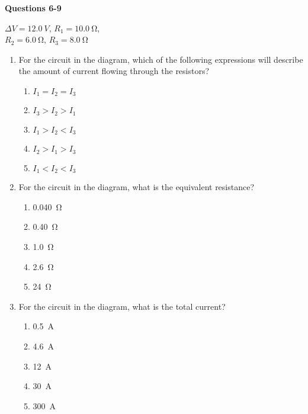 \documentclass{../../../oss-apphys}
\begin{document}
\begin{multicols}{2}
  \textbf{Questions 6-9}
  \begin{center}
    
    \vspace{.1in}$\Delta V=\SI{12.0}{V}$, $R_1=\SI{10.0}{\ohm}$,\\
    $R_2=\SI{6.0}{\ohm}$, $R_3=\SI{8.0}{\ohm}$
  \end{center}

  \begin{enumerate}[leftmargin=18pt,resume]
  \item For the circuit in the diagram, which of the following expressions will
    describe the amount of current flowing through the resistors?
    \begin{enumerate}[noitemsep,topsep=0pt,leftmargin=18pt,label=(\Alph*)]
    \item $I_1=I_2=I_3$
    \item $I_3>I_2>I_1$
    \item $I_1>I_2<I_3$
    \item $I_2>I_1>I_3$
    \item $I_1<I_2<I_3$
    \end{enumerate}
    
  \item For the circuit in the diagram, what is the equivalent resistance?
    \begin{enumerate}[noitemsep,topsep=0pt,leftmargin=18pt,label=(\Alph*)]
      \item\SI{0.040}{\ohm}
      \item\SI{0.40}{\ohm}
      \item\SI{1.0}{\ohm}
      \item\SI{2.6}{\ohm}
      \item\SI{24}{\ohm}
    \end{enumerate}
    
  \item For the circuit in the diagram, what is the total current?
    \begin{enumerate}[noitemsep,topsep=0pt,leftmargin=18pt,label=(\Alph*)]
    \item\SI{0.5}{A}
    \item\SI{4.6}{A}
    \item\SI{12}{A}
    \item\SI{30}{A}
    \item\SI{300}{A}
    \end{enumerate}
    

\end{enumerate}
\end{multicols}
\end{document}
